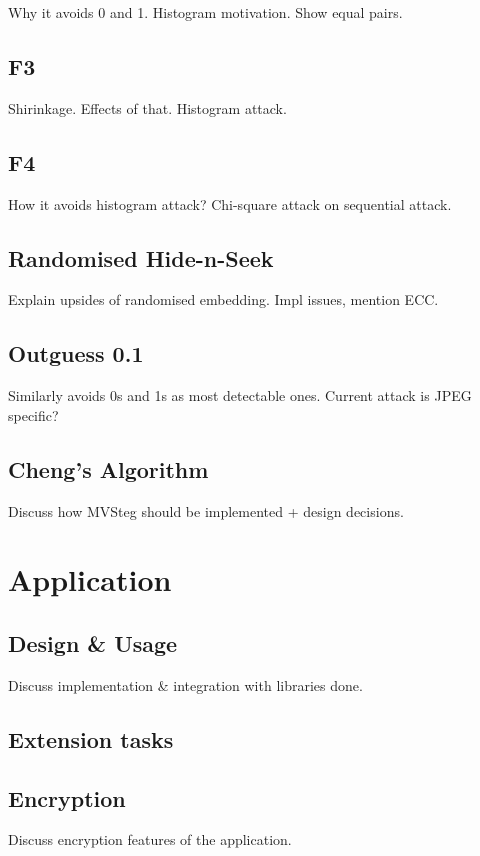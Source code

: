 \documentclass[12pt,british,twoside,notitlepage,usenames,dvipsnames,hypens,final]{report}
\numberwithin{equation}{section}
\numberwithin{figure}{section}
\begin{document}
Why it avoids 0 and 1. Histogram motivation. Show equal pairs.

\subsection{F3}

Shirinkage. Effects of that. Histogram attack.

\subsection{F4}

How it avoids histogram attack? Chi-square attack on sequential attack.

\subsection{Randomised Hide-n-Seek}

Explain upsides of randomised embedding. Impl issues, mention ECC. 

\subsection{Outguess 0.1}

Similarly avoids 0s and 1s as most detectable ones. Current attack is JPEG specific?

\subsection{Cheng's Algorithm}

Discuss how MVSteg should be implemented + design decisions.

\section{Application}

\subsection{Design \& Usage}

Discuss implementation \& integration with libraries done.

\subsection{Extension tasks}

\subsection{Encryption}
Discuss encryption features of the application.
\end{document}
